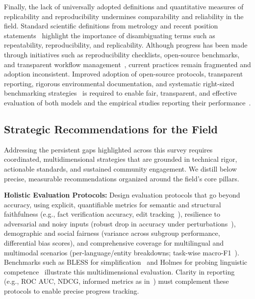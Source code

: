 \documentclass[sigconf]{acmart}
\begin{document}
Finally, the lack of universally adopted definitions and quantitative measures of replicability and reproducibility undermines comparability and reliability in the field. Standard scientific definitions from metrology and recent position statements~\cite{ref13,ref16,ref17,ref22,ref23,ref24,ref33,ref34,ref45,ref53,ref55,ref58,ref59,ref61,ref66,ref67,ref107,ref108} highlight the importance of disambiguating terms such as repeatability, reproducibility, and replicability. Although progress has been made through initiatives such as reproducibility checklists, open-source benchmarks, and transparent workflow management~\cite{ref28,ref33,ref104,ref106}, current practices remain fragmented and adoption inconsistent. Improved adoption of open-source protocols, transparent reporting, rigorous environmental documentation, and systematic right-sized benchmarking strategies~\cite{ref104} is required to enable fair, transparent, and effective evaluation of both models and the empirical studies reporting their performance~\cite{ref13,ref34,ref61,ref106,ref107,ref108}.

\subsection{Strategic Recommendations for the Field}

Addressing the persistent gaps highlighted across this survey requires coordinated, multidimensional strategies that are grounded in technical rigor, actionable standards, and sustained community engagement. We distill below precise, measurable recommendations organized around the field's core pillars.

\textbf{Holistic Evaluation Protocols:}
Design evaluation protocols that go beyond accuracy, using explicit, quantifiable metrics for semantic and structural faithfulness (e.g., fact verification accuracy, edit tracking~\cite{ref76}), resilience to adversarial and noisy inputs (robust drop in accuracy under perturbations~\cite{ref78,ref105}), demographic and social fairness (variance across subgroup performance, differential bias scores), and comprehensive coverage for multilingual and multimodal scenarios (per-language/entity breakdowns; task-wise macro-F1~\cite{ref94,ref95}). Benchmarks such as BLESS for simplification~\cite{ref106} and Holmes for probing linguistic competence~\cite{ref97} illustrate this multidimensional evaluation. Clarity in reporting (e.g., ROC AUC, NDCG, informed metrics as in~\cite{ref79}) must complement these protocols to enable precise progress tracking.
\end{document}
